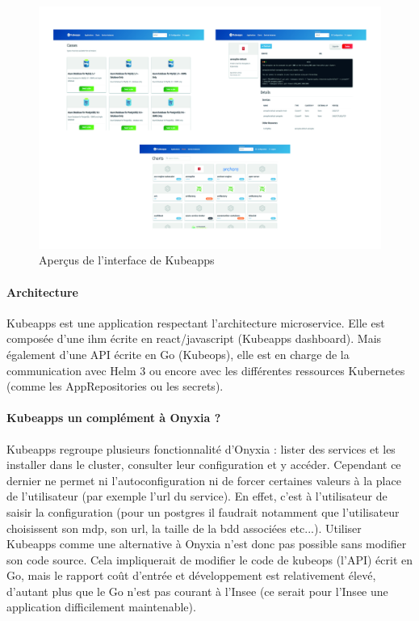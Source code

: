\documentclass[11pt,fleqn]{book} %
\begin{document}
\begin{figure}[H]\centering
\renewcommand{\figurename}{Capture d'écran}
\hspace{-1cm}
\includegraphics[scale=0.10]{Pictures/onyxia/kubeapps.jpg}
\captionsetup{margin=1.5cm,format=hang,justification=justified}
\caption[]{Aperçus de l'interface de Kubeapps \newline}
\end{figure}

\paragraph{Architecture}
Kubeapps est une application respectant l'architecture microservice. Elle est composée d'une ihm écrite en react/javascript (Kubeapps dashboard). Mais également d'une API écrite en Go (Kubeops), elle est en charge de la communication avec Helm 3 ou encore avec les différentes ressources Kubernetes (comme les AppRepositories ou les secrets).\\

\paragraph{Kubeapps un complément à Onyxia ?}
Kubeapps regroupe plusieurs fonctionnalité d'Onyxia : lister des services et les installer dans le cluster, consulter leur configuration et y accéder. Cependant ce dernier ne permet ni l'autoconfiguration ni de forcer certaines valeurs à la place de l'utilisateur (par exemple l'url du service). En effet, c'est à l'utilisateur de saisir la configuration (pour un postgres il faudrait notamment que l'utilisateur choisissent son mdp, son url, la taille de la bdd associées etc...). Utiliser Kubeapps comme une alternative à Onyxia n'est donc pas possible sans modifier son code source. Cela impliquerait de modifier le code de kubeops (l'API) écrit en Go, mais le rapport coût d'entrée et développement est relativement élevé, d'autant plus que le Go n'est pas courant à l'Insee (ce serait pour l'Insee une application difficilement maintenable).\newline
\end{document}
